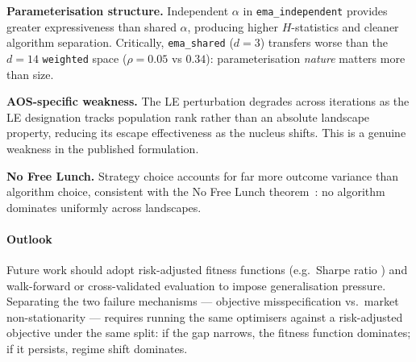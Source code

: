 \textbf{Parameterisation structure.} Independent $\alpha$ in
\texttt{ema\_independent} provides greater expressiveness than shared
$\alpha$, producing higher $H$-statistics and cleaner algorithm separation.
Critically, \texttt{ema\_shared} ($d=3$) transfers worse than the $d=14$
\texttt{weighted} space ($\rho = 0.05$ vs $0.34$): parameterisation
\emph{nature} matters more than size.

\textbf{AOS-specific weakness.} The LE perturbation degrades across
iterations as the LE designation tracks population rank rather than an
absolute landscape property, reducing its escape effectiveness as the nucleus
shifts. This is a genuine weakness in the published formulation.

\textbf{No Free Lunch.} Strategy choice accounts for far more outcome
variance than algorithm choice, consistent with the No Free Lunch
theorem~\cite{wolpert1997}: no algorithm dominates uniformly across
landscapes.

\paragraph*{Outlook}
Future work should adopt risk-adjusted fitness functions (e.g.\ Sharpe ratio
\cite{investopedia_sharpe_ratio}) and walk-forward or cross-validated
evaluation to impose generalisation pressure. Separating the two failure
mechanisms --- objective misspecification vs.\ market non-stationarity ---
requires running the same optimisers against a risk-adjusted objective under
the same split: if the gap narrows, the fitness function dominates; if it
persists, regime shift dominates.